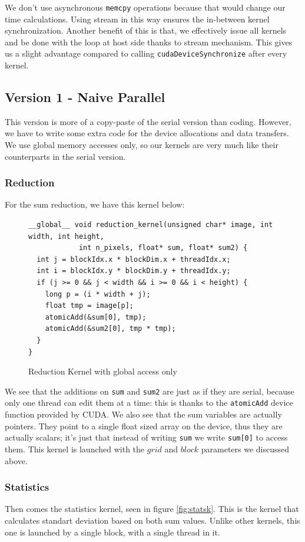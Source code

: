 \documentclass[12pt,reqno]{amsart}
\newcommand{\code}[1]{\texttt{#1}}
\begin{document}
We don't use asynchronous \code{memcpy} operations because that would change our time calculations. Using stream in this way ensures the in-between kernel synchronization. Another benefit of this is that, we effectively issue all kernels and be done with the loop at host side thanks to stream mechanism. This gives us a slight advantage compared to calling \code{cudaDeviceSynchronize} after every kernel.

\subsection{Version 1 - Naive Parallel}
This version is more of a copy-paste of the serial version than coding. However, we have to write some extra code for the device allocations and data transfers. We use global memory accesses only, so our kernels are very much like their counterparts in the serial version. 

\subsubsection{Reduction} For the sum reduction, we have this kernel below:
\begin{figure}[h]
\centering
\begin{lstlisting}
__global__ void reduction_kernel(unsigned char* image, int width, int height, 
            int n_pixels, float* sum, float* sum2) { 
  int j = blockIdx.x * blockDim.x + threadIdx.x;
  int i = blockIdx.y * blockDim.y + threadIdx.y;
  if (j >= 0 && j < width && i >= 0 && i < height) {
    long p = (i * width + j);
    float tmp = image[p];
    atomicAdd(&sum[0], tmp);
    atomicAdd(&sum2[0], tmp * tmp); 
  }	
}
\end{lstlisting}
\label{fig:redkern}
\caption{Reduction Kernel with global access only}
\end{figure}

We see that the additions on \code{sum} and \code{sum2} are just as if they are serial, because only one thread can edit them at a time: this is thanks to the \code{atomicAdd} device function provided by CUDA. We also see that the sum variables are actually pointers. They point to a single float sized array on the device, thus they are actually scalars; it's just that instead of writing \code{sum} we write \code{sum[0]} to access them. This kernel is launched with the $grid$ and $block$ parameters we discussed above.

\subsubsection{Statistics} Then comes the statistics kernel, seen in figure \ref{fig:statsk}. This is the kernel that calculates standart deviation based on both sum values. Unlike other kernels, this one is launched by a single block, with a single thread in it.
\end{document}
